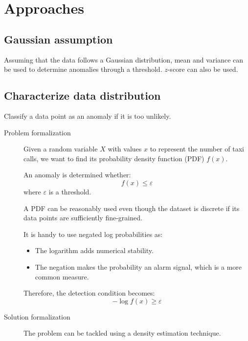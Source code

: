 \section{Approaches}


\subsection{Gaussian assumption}

Assuming that the data follows a Gaussian distribution, mean and variance can be used to determine anomalies through a threshold. $z$-score can also be used.


\subsection{Characterize data distribution}

Classify a data point as an anomaly if it is too unlikely.

\begin{description}
    \item[Problem formalization] 
        Given a random variable $X$ with values $x$ to represent the number of taxi calls, we want to find its probability density function (PDF) $f(x)$.

        An anomaly is determined whether:
        \[ f(x) \leq \varepsilon \]
        where $\varepsilon$ is a threshold.

        \begin{remark}
            A PDF can be reasonably used even though the dataset is discrete if its data points are sufficiently fine-grained.
        \end{remark}

        \begin{remark}
            It is handy to use negated log probabilities as:
            \begin{itemize}
                \item The logarithm adds numerical stability.
                \item The negation makes the probability an alarm signal, which is a more common measure.
            \end{itemize}
            Therefore, the detection condition becomes:
            \[ - \log f(x) \geq \varepsilon \]
        \end{remark}

    \item[Solution formalization]
        The problem can be tackled using a density estimation technique.
\end{description}



